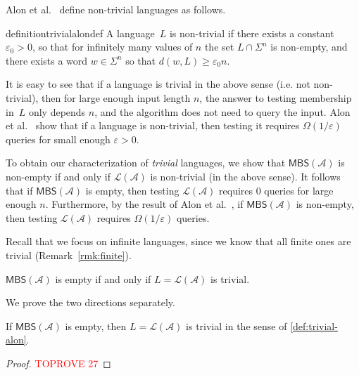 \documentclass[letterpaper, USenglish, cleveref, autoref, thm-restate, numberwithinsect]{lipics-v2021}
\theoremstyle{theorem}
\theoremstyle{definition}
\newcommand{\Aa}{\mathcal{A}}
\newcommand{\eps}{\varepsilon}
\newcommand{\lang}[1]{\mathcal{L}(#1)}
\newcommand{\MBS}{\textsf{MBS}\xspace}
\begin{document}
Alon et al.~\cite{alon2001regular} define non-trivial languages as follows.
\begin{restatable}{definition}{trivialalondef}\label{def:trivial-alon}
	A language~$L$ is non-trivial if there exists a constant $\eps_0 > 0$, so that for infinitely
	many values of $n$ the set $L\cap\Sigma^n$ is non-empty, and there exists a word $w \in \Sigma^n$ so that $d(w, L) \ge \eps_0 n$.
\end{restatable}
It is easy to see that if a language is trivial in the above sense (i.e. not non-trivial), then for large enough input length $n$, the answer to testing membership in~$L$ only depends $n$, and the algorithm does not need to query the input.
Alon et al.~\cite[Property 2]{alon2001regular} show that if a language is non-trivial, then testing it requires $\Omega(1/\eps)$ queries for small enough $\eps > 0$.

To obtain our characterization of \emph{trivial} languages, we show that $\MBS(\Aa)$ is non-empty if and only if $\lang{\Aa}$ is non-trivial (in the above sense).
It follows that if $\MBS(\Aa)$ is empty, then testing $\lang{\Aa}$ requires $0$ queries for large enough $n$.
Furthermore, by the result of Alon et al.~\cite{alon2001regular}, if $\MBS(\Aa)$ is non-empty, then testing $\lang{\Aa}$ requires $\Omega(1/\eps)$ queries.

Recall that we focus on infinite languages, since we know that all finite ones are trivial (Remark~\ref{rmk:finite}). 
\begin{lemma}\label{lem:trivialiffMBSempty}
	$\MBS(\Aa)$ is empty if and only if $L = \lang{\Aa}$ is trivial.
\end{lemma}

We prove the two directions separately.
\begin{lemma}
	If $\MBS(\Aa)$ is empty, then $L = \lang{\Aa}$ is trivial in the sense of \cref{def:trivial-alon}.
\end{lemma}
\begin{proof}\textcolor{red}{TOPROVE 27}\end{proof}
\end{document}
